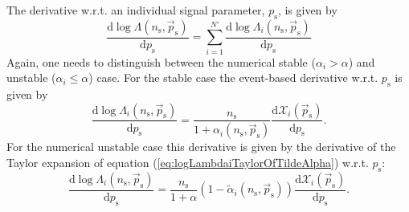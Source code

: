 \documentclass{article}
\newcommand{\ns}{n_{\mathrm{s}}}
\newcommand{\ps}{\vec{p}_{\mathrm{s}}}
\begin{document}
The derivative w.r.t. an individual signal parameter, $p_{\mathrm{s}}$, is given by
\begin{equation}
 \frac{\mathrm{d} \log \Lambda(\ns,\ps)}{\mathrm{d} p_{\mathrm{s}}} = \sum_{i=1}^{N'} \frac{\mathrm{d}\log\Lambda_i(\ns,\ps)}{\mathrm{d}p_{\mathrm{s}}}
\end{equation}
Again, one needs to distinguish between the numerical stable ($\alpha_i > \alpha$)
and unstable ($\alpha_i \leq \alpha$) case.
For the stable case the event-based derivative w.r.t. $p_{\mathrm{s}}$ is given by
\begin{equation}
 \frac{\mathrm{d}\log\Lambda_i(\ns,\ps)}{\mathrm{d}p_{\mathrm{s}}} = \frac{\ns}{1+\alpha_i(\ns,\ps)} \frac{\mathrm{d}\mathcal{X}_i(\ps)}{\mathrm{d}p_{\mathrm{s}}}.
\end{equation}
For the numerical unstable case this derivative is
given by the derivative of the Taylor expansion of equation (\ref{eq:logLambdaiTaylorOfTildeAlpha})
w.r.t. $p_{\mathrm{s}}$:
\begin{equation}
 \frac{\mathrm{d}\log\Lambda_i(\ns,\ps)}{\mathrm{d}p_{\mathrm{s}}} = \frac{\ns}{1+\alpha}\left(1 - \tilde{\alpha}_i(\ns,\ps)\right) \frac{\mathrm{d}\mathcal{X}_i(\ps)}{\mathrm{d}p_{\mathrm{s}}}.
\end{equation}
\end{document}
